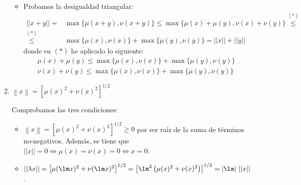 \begin{ejercicio}
\begin{enumerate}
\begin{itemize}
            \item Probamos la desigualdad triangular:
            \begin{equation*}
                \begin{split}
                    ||x+y||
                    =& \max\{\mu(x+y),\nu(x+y)\}
                    \leq \max\{\mu(x)+\mu(y), \nu(x)+\nu(y)\} \stackrel{(\ast)}{\leq}\\
                    \stackrel{(\ast)}{\leq}& \max\{\mu(x), \nu(x)\} + \max\{\mu(y), \nu(y)\}
                    = ||x||+||y||
                \end{split}
            \end{equation*}
            donde en $(\ast)$ he aplicado lo siguiente:
            \begin{gather*}
                \mu(x)+\mu(y) \leq \max\{\mu(x), \nu(x)\} + \max\{\mu(y), \nu(y)\} \\
                \nu(x)+\nu(y) \leq \max\{\mu(x), \nu(x)\} + \max\{\mu(y), \nu(y)\}
            \end{gather*}
            
            
        \end{itemize}
        \item $\left\lVert x \right\rVert = \left[\mu (x)^{2} + \nu(x)^2\right]^{1/2}$
        
        Comprobamos las tres condiciones:
        \begin{itemize}
            \item $\left\lVert x \right\rVert =  \left[\mu (x)^{2} + \nu(x)^2\right]^{1/2}\geq 0$ por ser raíz de la suma de términos no-negativos. Además, se tiene que $||x||=0\Longleftrightarrow \mu(x)=\nu(x)=0\Longleftrightarrow x=0$.

            \item $||\lambda x|| =  \left[\mu (\lm x)^{2} + \nu(\lm x)^2\right]^{1/2} = \left[\lm^2 \left(\mu (x)^{2} + \nu(x)^2\right)\right]^{1/2} = |\lm|~||x||$.


\end{itemize}
\end{enumerate}
\end{ejercicio}
